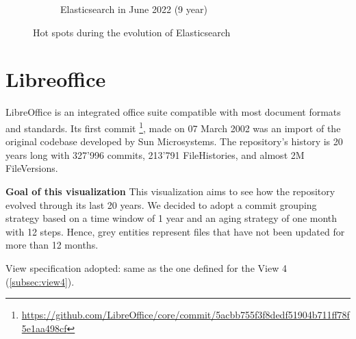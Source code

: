 \begin{figure}[ht]
\begin{subfigure}{0.48\textwidth}
        \caption{Elasticsearch in June 2022 (9 year)} 
        \label{fig:Elastic_V5_S6}
    \end{subfigure}
    
    \caption{Hot spots during the evolution of Elasticsearch} 
    \label{fig:Elastic_V5}
\end{figure}


\clearpage
\section{Libreoffice}
LibreOffice is an integrated office suite compatible with most document formats and standards. Its first commit \footnote{\url{https://github.com/LibreOffice/core/commit/5acbb755f3f8dedf51904b711ff78f5e1aa498cf}}, made on 07 March 2002 was an import of the original codebase developed by Sun Microsystems. The repository's history is 20 years long with 327'996 commits, 213'791 FileHistories, and almost 2M FileVersions. 

\textbf{Goal of this visualization}
This visualization aims to see how the repository evolved through its last 20 years. We decided to adopt a commit grouping strategy based on a time window of 1 year and an aging strategy of one month with 12 steps. Hence, grey entities represent files that have not been updated for more than 12 months. 


View specification adopted: same as the one defined for the View 4 (\autoref{subsec:view4}).

